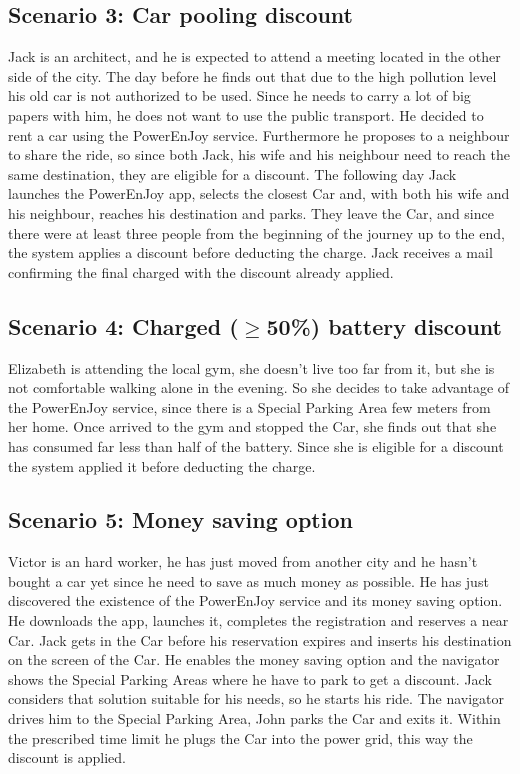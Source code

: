 \subsection{Scenario 3: Car pooling discount}
Jack is an architect, and he is expected to attend a meeting located in the other side of the city. The day before he finds out that due to the high pollution level his old car is not authorized to be used. Since he needs to carry a lot of big papers with him, he does not want to use the public transport. He decided to rent a car using the PowerEnJoy service. Furthermore he proposes to a neighbour to share the ride, so since both Jack, his wife and his neighbour need to reach the same destination, they are eligible for a discount. The following day Jack launches the PowerEnJoy app, selects the closest Car and, with both his wife and his neighbour, reaches his destination and parks. They leave the Car, and since there were at least three people from the beginning of the journey up to the end, the system applies a discount before deducting the charge. Jack receives a mail confirming the final charged with the discount already applied.

\subsection{Scenario 4: Charged ($\geq$50\%) battery discount}
Elizabeth is attending the local gym, she doesn't live too far from it, but she is not comfortable walking alone in the evening. So she decides to take advantage of the PowerEnJoy service, since there is a Special Parking Area few meters from her home. Once arrived to the gym and stopped the Car, she finds out that she has consumed far less than half of the battery. Since she is eligible for a discount the system applied it before deducting the charge.

\subsection{Scenario 5: Money saving option}
Victor is an hard worker, he has just moved from another city and he hasn't bought a car yet since he need to save as much money as possible. He has just discovered the existence of the PowerEnJoy service and its money saving option. He downloads the app, launches it, completes the registration and reserves a near Car. Jack gets in the Car before his reservation expires and inserts his destination on the screen of the Car. He enables the money saving option and the navigator shows the Special Parking Areas where he have to park to get a discount. Jack considers that solution suitable for his needs, so he starts his ride. The navigator drives him to the Special Parking Area, John parks the Car and exits it. Within the prescribed time limit he plugs the Car into the power grid, this way the discount is applied.

